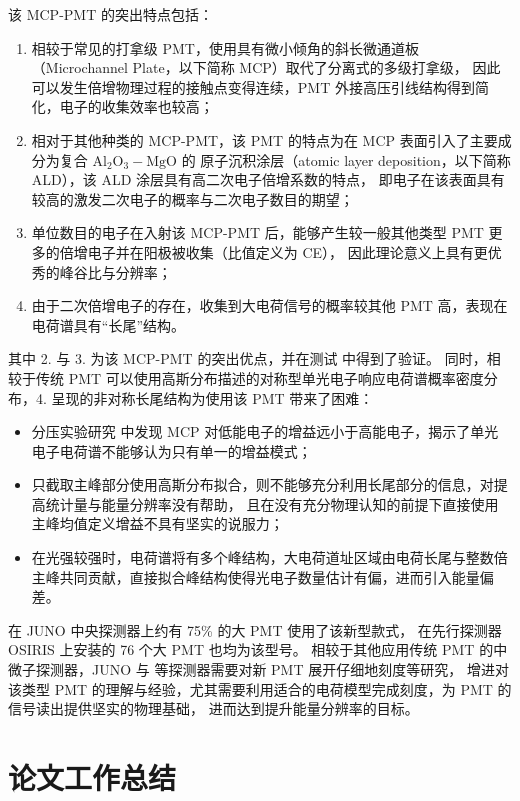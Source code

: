 该 MCP-PMT 的突出特点包括：
\begin{enumerate}
    \item 相较于常见的打拿级 PMT，使用具有微小倾角的斜长微通道板（Microchannel Plate，以下简称 MCP）取代了分离式的多级打拿级，
    因此可以发生倍增物理过程的接触点变得连续，PMT 外接高压引线结构得到简化，电子的收集效率也较高；
    \item 相对于其他种类的 MCP-PMT，该 PMT 的特点为在 MCP 表面引入了主要成分为复合 $\text{Al}_2\text{O}_3-\text{MgO}$ 的
    原子沉积涂层（atomic layer deposition，以下简称 ALD），该 ALD 涂层具有高二次电子倍增系数的特点，
    即电子在该表面具有较高的激发二次电子的概率与二次电子数目的期望；
    \item 单位数目的电子在入射该 MCP-PMT 后，能够产生较一般其他类型 PMT 更多的倍增电子并在阳极被收集（比值定义为 CE），
    因此理论意义上具有更优秀的峰谷比与分辨率；
    \item 由于二次倍增电子的存在，收集到大电荷信号的概率较其他 PMT 高，表现在电荷谱具有“长尾”结构。
\end{enumerate}

其中 2. 与 3. 为该 MCP-PMT 的突出优点，并在测试\cite{zhangPerformanceEvaluation8inch2023} 中得到了验证。
同时，相较于传统 PMT 可以使用高斯分布描述的对称型单光电子响应电荷谱概率密度分布，4. 呈现的非对称长尾结构为使用该 PMT 带来了困难：
\begin{itemize}
    \item 分压实验研究\cite{yangMCPPerformanceImprovement2017} 中发现 MCP 对低能电子的增益远小于高能电子，揭示了单光电子电荷谱不能够认为只有单一的增益模式；
    \item 只截取主峰部分使用高斯分布拟合，则不能够充分利用长尾部分的信息，对提高统计量与能量分辨率没有帮助，
    且在没有充分物理认知的前提下直接使用主峰均值定义增益不具有坚实的说服力；
    \item 在光强较强时，电荷谱将有多个峰结构，大电荷道址区域由电荷长尾与整数倍主峰共同贡献，直接拟合峰结构使得光电子数量估计有偏，进而引入能量偏差。
\end{itemize}

在 JUNO 中央探测器上约有 75\% 的大 PMT 使用了该新型款式，
在先行探测器 OSIRIS 上安装的 76 个大 PMT 也均为该型号。
相较于其他应用传统 PMT 的中微子探测器，JUNO 与 等探测器需要对新 PMT 展开仔细地刻度等研究，
增进对该类型 PMT 的理解与经验，尤其需要利用适合的电荷模型完成刻度，为 PMT 的信号读出提供坚实的物理基础，
进而达到提升能量分辨率的目标。

\section{论文工作总结}
